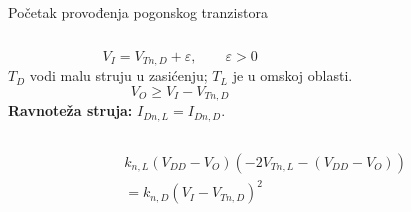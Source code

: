 \begin{frame}[label=09_2-s003]{Početak provođenja pogonskog tranzistora}
\begin{columns}[T,onlytextwidth]\centering {}\[V_I=V_{Tn,D}+\varepsilon,\qquad \varepsilon>0\]
$T_D$ vodi malu struju u zasićenju; $T_L$ je u omskoj oblasti.
\[V_O\geq V_I-V_{Tn,D}\]
\textbf{Ravnoteža struja:} $I_{Dn,L}=I_{Dn,D}$.
\end{columns}
\[\begin{aligned}&k_{n,L}(V_{DD}-V_O)\left(-2V_{Tn,L}-(V_{DD}-V_O)\right)\\&=k_{n,D}(V_I-V_{Tn,D})^2\end{aligned}\]


\end{frame}
